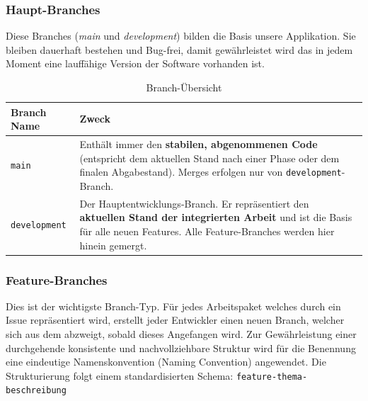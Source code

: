 \subsubsection{Haupt-Branches}
Diese Branches (\textit{main} und \textit{development}) bilden die Basis unsere Applikation. Sie bleiben dauerhaft bestehen und Bug-frei, damit gewährleistet wird das in jedem Moment eine lauffähige Version der Software vorhanden ist. 
\begin{table}[h]
\centering
\begin{tabular}{|p{}|p{}|}
\hline
\textbf{Branch Name} & \textbf{Zweck} \\
\hline
\texttt{main} &
Enthält immer den \textbf{stabilen, abgenommenen Code}
(entspricht dem aktuellen Stand nach einer Phase oder dem
finalen Abgabestand). Merges erfolgen nur von
\texttt{development}-Branch. \\
\hline
\texttt{development} &
Der Hauptentwicklungs-Branch. Er repräsentiert den
\textbf{aktuellen Stand der integrierten Arbeit} und ist
die Basis für alle neuen Features. Alle Feature-Branches
werden hier hinein gemergt. \\
\hline
\end{tabular}
\caption{Branch-Übersicht}
\label{tab:branches}
\end{table}

\subsubsection{Feature-Branches}
Dies ist der wichtigste Branch-Typ. Für jedes Arbeitspaket welches durch ein Issue repräsentiert wird, erstellt jeder Entwickler einen neuen Branch, welcher sich aus dem  abzweigt, sobald dieses Angefangen wird. Zur Gewährleistung einer durchgehende konsistente und nachvollziehbare Struktur wird für die Benennung eine eindeutige Namenskonvention (Naming Convention) angewendet. 
Die Strukturierung folgt einem standardisierten Schema:
\texttt{feature-\textlangle thema\textrangle-\textlangle beschreibung\textrangle}

